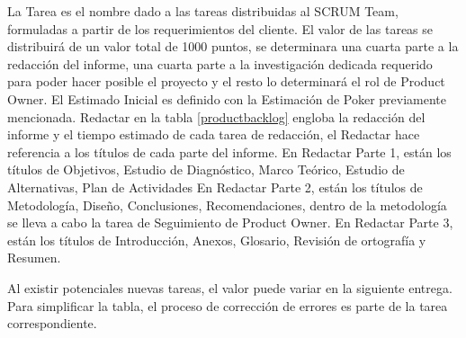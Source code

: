 La Tarea es el nombre dado a las tareas distribuidas al SCRUM Team, formuladas a partir de los requerimientos del cliente.
El valor de las tareas se distribuirá de un valor total de 1000 puntos, se determinara una cuarta parte a la redacción del informe, una cuarta parte a la investigación dedicada requerido para poder hacer posible el proyecto y el resto lo determinará el rol de Product Owner.
El Estimado Inicial es definido con la Estimación de Poker previamente mencionada.
Redactar en la tabla \ref{productbacklog} engloba la redacción del informe y el tiempo estimado de cada tarea de redacción, el Redactar hace referencia a los títulos de cada parte del informe.
En Redactar Parte 1, están los títulos de Objetivos, Estudio de Diagnóstico, Marco Teórico, Estudio de Alternativas, Plan de Actividades
En Redactar Parte 2, están los títulos de Metodología, Diseño, Conclusiones, Recomendaciones, dentro de la metodología se lleva a cabo la tarea de Seguimiento de Product Owner.
En Redactar Parte 3, están los títulos de Introducción, Anexos, Glosario, Revisión de ortografía y Resumen.

Al existir potenciales nuevas tareas, el valor puede variar en la siguiente entrega. Para simplificar la tabla, el proceso de corrección de errores es parte de la tarea correspondiente.

